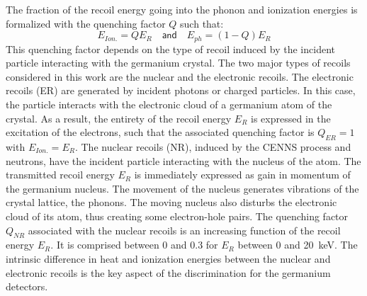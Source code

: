 The fraction of the recoil energy going into the phonon and ionization energies is formalized with the quenching factor $Q$ such that:
\begin{equation}
\label{eq:quenching-intro}
E_{Ion.} = Q E_R \quad \textsf{and} \quad E_{ph} = (1-Q) E_R
\end{equation}
This quenching factor depends on the type of recoil induced by the incident particle interacting with the germanium crystal. The two major types of recoils considered in this work are the nuclear and the electronic recoils.
The electronic recoils (ER) are generated by incident photons or charged particles. In this case, the particle interacts with the electronic cloud of a germanium atom of the crystal. As a result, the entirety of the recoil energy $E_R$ is expressed in the excitation of the electrons, such that the associated quenching factor is $Q_{ER} = 1$ with $E_{Ion.} = E_R$.
The nuclear recoils (NR), induced by the CENNS process and neutrons, have the incident particle interacting with the nucleus of the atom. The transmitted recoil energy $E_R$ is immediately expressed as gain in momentum of the germanium nucleus. The movement of the nucleus generates vibrations of the crystal lattice, the phonons. The moving nucleus also disturbs the electronic cloud of its atom, thus creating some electron-hole pairs. The quenching factor $Q_{NR}$ associated with the nuclear recoils is an increasing function of the recoil energy $E_R$. It is comprised between 0 and 0.3 for $E_R$ between 0 and \SI{20}{\kilo\eV}.
The intrinsic difference in heat and ionization energies between the nuclear and electronic recoils is the key aspect of the discrimination for the germanium detectors.

